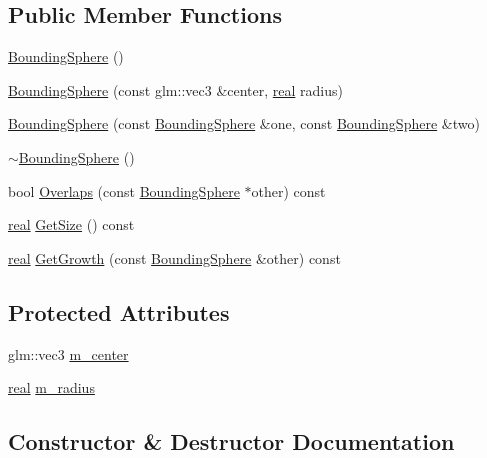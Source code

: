 \subsection*{Public Member Functions}
\begin{DoxyCompactItemize}
\item 
\hyperlink{classrum_1_1_bounding_sphere_a9fcd71c636d8603a7f2b8bf0571187ef}{Bounding\+Sphere} ()
\item 
\hyperlink{classrum_1_1_bounding_sphere_adc0112926da70e6670fd75feb04ba1d0}{Bounding\+Sphere} (const glm\+::vec3 \&center, \hyperlink{namespacerum_a7e8cca23573d5eaead0f138cbaa4862c}{real} radius)
\item 
\hyperlink{classrum_1_1_bounding_sphere_ad97a79a4d245770556b3526d3db9cad8}{Bounding\+Sphere} (const \hyperlink{classrum_1_1_bounding_sphere}{Bounding\+Sphere} \&one, const \hyperlink{classrum_1_1_bounding_sphere}{Bounding\+Sphere} \&two)
\item 
\hyperlink{classrum_1_1_bounding_sphere_a2a6e3e469ebaa4a783cc0688c065d171}{$\sim$\+Bounding\+Sphere} ()
\item 
bool \hyperlink{classrum_1_1_bounding_sphere_a7e6b47e6ec7600266a2df32a04e3b075}{Overlaps} (const \hyperlink{classrum_1_1_bounding_sphere}{Bounding\+Sphere} $\ast$other) const
\item 
\hyperlink{namespacerum_a7e8cca23573d5eaead0f138cbaa4862c}{real} \hyperlink{classrum_1_1_bounding_sphere_ab1921b42cca30a1c9deb3bee24c6d423}{Get\+Size} () const
\item 
\hyperlink{namespacerum_a7e8cca23573d5eaead0f138cbaa4862c}{real} \hyperlink{classrum_1_1_bounding_sphere_a69dfe111291edb351c1b316818fd136e}{Get\+Growth} (const \hyperlink{classrum_1_1_bounding_sphere}{Bounding\+Sphere} \&other) const
\end{DoxyCompactItemize}
\subsection*{Protected Attributes}
\begin{DoxyCompactItemize}
\item 
glm\+::vec3 \hyperlink{classrum_1_1_bounding_sphere_acc7a118371f95f36831b12c1862fbfb1}{m\+\_\+center}
\item 
\hyperlink{namespacerum_a7e8cca23573d5eaead0f138cbaa4862c}{real} \hyperlink{classrum_1_1_bounding_sphere_acc810ba77f514caeef45a248f2ffb67c}{m\+\_\+radius}
\end{DoxyCompactItemize}


\subsection{Constructor \& Destructor Documentation}
\mbox{\label{classrum_1_1_bounding_sphere_a9fcd71c636d8603a7f2b8bf0571187ef}} 

